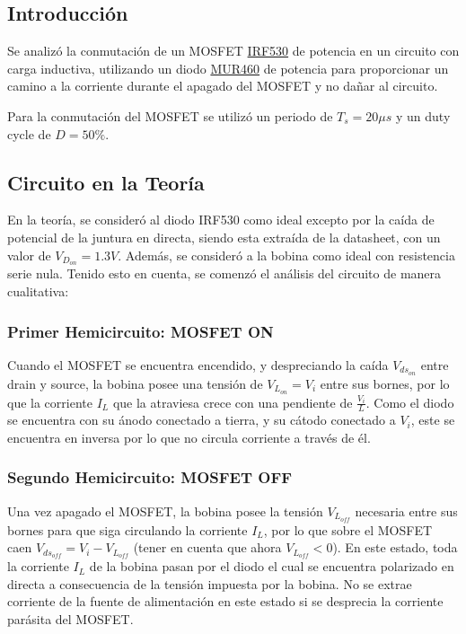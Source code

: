 



\subsection{Introducción}

Se analizó la conmutación de un MOSFET \href{https://www.vishay.com/docs/91019/91019.pdf}{IRF530} de potencia en un circuito con carga inductiva, utilizando un diodo \href{https://www.onsemi.com/pdf/datasheet/mur420-d.pdf}{MUR460} de potencia para proporcionar un camino a la corriente durante el apagado del MOSFET y no dañar al circuito.


Para la conmutación del MOSFET se utilizó un periodo de $T_s = 20 \mu s$ y un duty cycle de $D = 50 \%$.

\subsection{Circuito en la Teoría}

En la teoría, se consideró al diodo IRF530 como ideal excepto por la caída de potencial de la juntura en directa, siendo esta extraída de la datasheet, con un valor de $V_{D_{on}} = 1.3V$. Además, se consideró a la bobina como ideal con resistencia serie nula.
Tenido esto en cuenta, se comenzó el análisis del circuito de manera cualitativa:

\subsubsection{Primer Hemicircuito: MOSFET ON}

Cuando el MOSFET se encuentra encendido, y despreciando la caída $V_{ds_{on}}$ entre drain y source, la bobina posee una tensión de $V_{L_{on}} = V_i$ entre sus bornes, por lo que la corriente $I_L$ que la atraviesa crece con una pendiente de $\frac{V_i}{L}$. Como el diodo se encuentra con su ánodo conectado a tierra, y su cátodo conectado a $V_i$, este se encuentra en inversa por lo que no circula corriente a través de él.

\subsubsection{Segundo Hemicircuito: MOSFET OFF}

Una vez apagado el MOSFET, la bobina posee la tensión $V_{L_{off}}$ necesaria entre sus bornes para que siga circulando la corriente $I_L$, por lo que sobre el MOSFET caen $V_{ds_{off}} = V_i - V_{L_{off}}$ (tener en cuenta que ahora $V_{L_{off}} < 0$). En este estado, toda la corriente $I_L$ de la bobina pasan por el diodo el cual se encuentra polarizado en directa a consecuencia de la tensión impuesta por la bobina. No se extrae corriente de la fuente de alimentación en este estado si se desprecia la corriente parásita del MOSFET.

